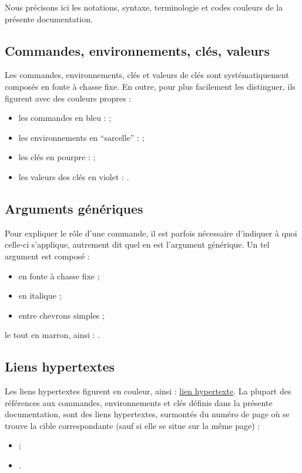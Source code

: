 \documentclass[french,nolocaltoc]{nwejmart}
\newtheorem[title=Fait,style=definition]{fact}
\begin{document}
Nous précisons ici les notations, syntaxe, terminologie et codes couleurs de
la présente documentation.

\subsection{Commandes, environnements, clés, valeurs}\label{sec-comm-envir-cles}

Les commandes, environnements, clés et valeurs de clés sont systématiquement
composés en fonte à chasse fixe. En outre, pour plus facilement les
distinguer, ils figurent avec des couleurs propres :
\begin{itemize}
\item les commandes en bleu :  ;
\item les environnements en \enquote{sarcelle} :
   ;
\item les clés en pourpre :  ;
\item les valeurs des clés en violet : .
\end{itemize}

\subsection{Arguments génériques}
\label{sec-arguments-generiques}

Pour expliquer le rôle d'une commande, il est parfois nécessaire d'indiquer
à quoi celle-ci s'applique, autrement dit quel en est l'argument générique.
Un tel argument est composé :
\begin{itemize}
\item en fonte à chasse fixe ;
\item en italique ;
\item entre chevrons simples ;
\end{itemize}
le tout en marron, ainsi : .

\subsection{Liens hypertextes}
\label{sec-liens-hypertextes}

Les liens hypertextes figurent en couleur, ainsi :
\href{http://gte.univ-littoral.fr/members/dbitouze/pub/latex}{lien hypertexte}.
La plupart des références aux commandes, environnements et clés définis dans la
présente documentation, sont des liens hypertextes, surmontés du numéro de page
où se trouve la cible correspondante (sauf si elle se situe sur la même page) :
\begin{itemize}
\item {} ;
\item {}.
\end{itemize}
\end{document}
